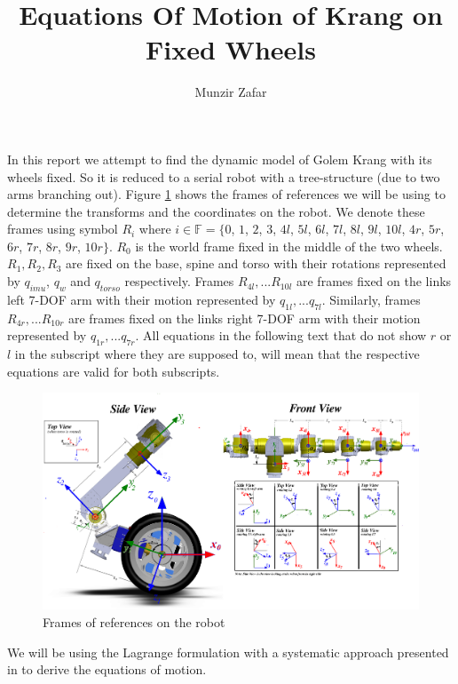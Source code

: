 \documentclass[a4paper,10pt]{article}
\title{Equations Of Motion of Krang on Fixed Wheels}
\author{Munzir Zafar}
\begin{document}
\maketitle

In this report we attempt to find the dynamic model of Golem Krang with its wheels fixed. So it
is reduced to a serial robot with a tree-structure (due to two arms branching out). Figure \ref{fig:frames}
shows the frames of references we will be using to determine the transforms and the coordinates on the robot.
We denote these frames using symbol $R_i$ where $i \in \mathbb{F} = \lbrace 0$, $1$, $2$, $3$, $4l$, $5l$, $6l$, $7l$,
$8l$, $9l$, $10l$, $4r$, $5r$, $6r$, $7r$, $8r$, $9r$, $10r \rbrace$. $R_0$ is the world frame fixed in the middle of
the two wheels. $R_1, R_2, R_3$ are fixed on the base, spine and torso with their rotations represented
by $q_{imu}$, $q_w$ and $q_{torso}$ respectively. Frames $R_{4l}, ... R_{10l}$ are frames fixed on the links left 7-DOF
arm with their motion represented by $q_{1l}, ... q_{7l}$. Similarly, frames $R_{4r}, ... R_{10r}$ are frames 
fixed on the links right 7-DOF arm with their motion represented by $q_{1r}, ... q_{7r}$. All equations in the 
following text that do not show $r$ or $l$ in the subscript where they are supposed to, will mean that the 
respective equations are valid for both subscripts.

\begin{figure}
 \centering
 \includegraphics[width=1.0\textwidth]{Figures/framesLHRule.png}
 \caption{Frames of references on the robot}
 \label{fig:frames}
\end{figure}

We will be using the Lagrange formulation with a systematic approach presented in \cite{khalil2004modeling} 
to derive the equations of motion.
\end{document}
